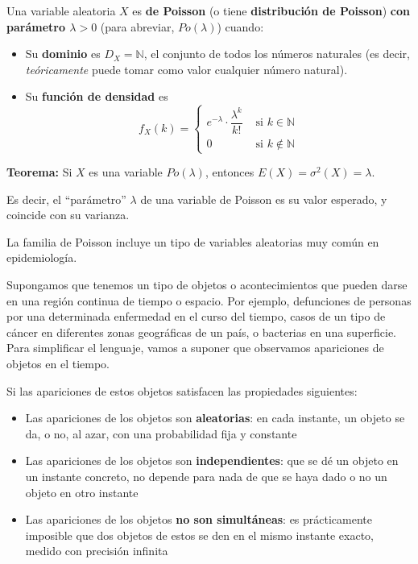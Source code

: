 \documentclass[
  spanish,
  letterpaper,
  DIV=11,
  numbers=noendperiod]{scrreprt}
\begin{document}
Una variable aleatoria \(X\) es \textbf{de Poisson} (o tiene
\textbf{distribución de Poisson}) \textbf{con parámetro \(\lambda>0\)}
(para abreviar, \(Po(\lambda)\)) cuando:

\begin{itemize}
\item
  Su \textbf{dominio} es \(D_X=\mathbb{N}\), el conjunto de todos los
  números naturales (es decir, \emph{teóricamente} puede tomar como
  valor cualquier número natural).
\item
  Su \textbf{función de densidad} es \[
  f_X(k)=\left\{\begin{array}{ll}
  e^{-\lambda}\cdot \dfrac{\lambda^k}{k!} &  \text{ si $k\in \mathbb{N}$}\\
  0 & \text{ si $k\notin \mathbb{N}$}
  \end{array}\right.
  \]
\end{itemize}

\textbf{Teorema:} Si \(X\) es una variable \(Po(\lambda)\), entonces
\(E(X)= \sigma^2(X)= \lambda\).

Es decir, el ``parámetro'' \(\lambda\) de una variable de Poisson es su
valor esperado, y coincide con su varianza.

La familia de Poisson incluye un tipo de variables aleatorias muy común
en epidemiología.

Supongamos que tenemos un tipo de objetos o acontecimientos que pueden
darse en una región continua de tiempo o espacio. Por ejemplo,
defunciones de personas por una determinada enfermedad en el curso del
tiempo, casos de un tipo de cáncer en diferentes zonas geográficas de un
país, o bacterias en una superficie. Para simplificar el lenguaje, vamos
a suponer que observamos apariciones de objetos en el tiempo.

Si las apariciones de estos objetos satisfacen las propiedades
siguientes:

\begin{itemize}
\item
  Las apariciones de los objetos son \textbf{aleatorias}: en cada
  instante, un objeto se da, o no, al azar, con una probabilidad fija y
  constante
\item
  Las apariciones de los objetos son \textbf{independientes}: que se dé
  un objeto en un instante concreto, no depende para nada de que se haya
  dado o no un objeto en otro instante
\item
  Las apariciones de los objetos \textbf{no son simultáneas}: es
  prácticamente imposible que dos objetos de estos se den en el mismo
  instante exacto, medido con precisión infinita
\end{itemize}
\end{document}
